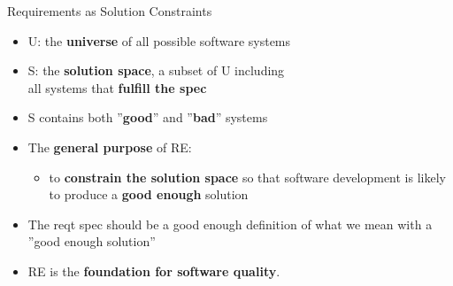 

\begin{Slide}{Requirements as Solution Constraints}

\begin{itemize}
\item U: the \textbf{universe} of all possible software systems

\item S: the \textbf{solution space}, a subset of U including\\all systems that \textbf{fulfill the spec}

\item S contains both ''\textbf{good}'' and ''\textbf{bad}'' systems

\item The \textbf{general purpose} of RE:
\begin{itemize}
\item to \textbf{constrain the solution space} so that software development is likely to produce a \textbf{good enough} solution

\end{itemize}
\item The reqt spec should be a good enough definition of what we mean with a ''good enough solution''

\item RE is the \textbf{foundation for software quality}.


\end{itemize}
\end{Slide}